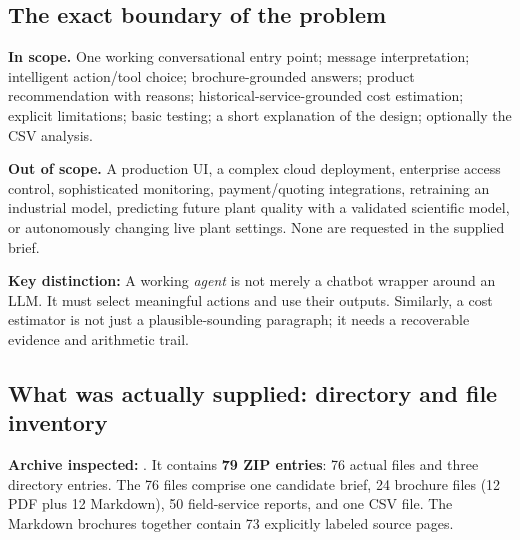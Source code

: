 \documentclass[11pt,a4paper]{article}
\DeclareRobustCommand{\code}[1]{{\ttfamily\small\detokenize{#1}}}
\newcommand{\term}[1]{\textbf{#1}}
\begin{document}
\subsection{The exact boundary of the problem}
\textbf{In scope.} One working conversational entry point; message interpretation; intelligent action/tool choice; brochure-grounded answers; product recommendation with reasons; historical-service-grounded cost estimation; explicit limitations; basic testing; a short explanation of the design; optionally the CSV analysis.

\textbf{Out of scope.} A production UI, a complex cloud deployment, enterprise access control, sophisticated monitoring, payment/quoting integrations, retraining an industrial model, predicting future plant quality with a validated scientific model, or autonomously changing live plant settings. None are requested in the supplied brief.

\begin{keybox}
\textbf{Key distinction:} A working \emph{agent} is not merely a chatbot wrapper around an LLM. It must select meaningful actions and use their outputs. Similarly, a cost estimator is not just a plausible-sounding paragraph; it needs a recoverable evidence and arithmetic trail.
\end{keybox}

\subsection{What was actually supplied: directory and file inventory}
\textbf{Archive inspected:} \code{AI-Engineer-Task.zip}. It contains \term{79 ZIP entries}: 76 actual files and three directory entries. The 76 files comprise one candidate brief, 24 brochure files (12 PDF plus 12 Markdown), 50 field-service reports, and one CSV file. The Markdown brochures together contain 73 explicitly labeled source pages.
\end{document}
